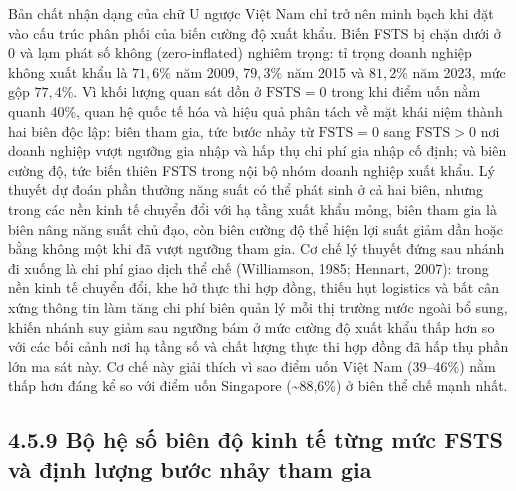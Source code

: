 \documentclass[
  a4paper,
  13pt]{extreport}
\begin{document}
Bản chất nhận dạng của chữ U ngược Việt Nam chỉ trở nên minh bạch khi
đặt vào cấu trúc phân phối của biến cường độ xuất khẩu. Biến FSTS bị
chặn dưới ở 0 và lạm phát số không (zero-inflated) nghiêm trọng: tỉ
trọng doanh nghiệp không xuất khẩu là \(71{,}6\%\) năm 2009,
\(79{,}3\%\) năm 2015 và \(81{,}2\%\) năm 2023, mức gộp \(77{,}4\%\). Vì
khối lượng quan sát dồn ở \(\mathrm{FSTS} = 0\) trong khi điểm uốn nằm
quanh 40\%, quan hệ quốc tế hóa và hiệu quả phân tách về mặt khái niệm
thành hai biên độc lập: biên tham gia, tức bước nhảy từ
\(\mathrm{FSTS} = 0\) sang \(\mathrm{FSTS} > 0\) nơi doanh nghiệp vượt
ngưỡng gia nhập và hấp thụ chi phí gia nhập cố định; và biên cường độ,
tức biến thiên FSTS trong nội bộ nhóm doanh nghiệp xuất khẩu. Lý thuyết
dự đoán phần thưởng năng suất có thể phát sinh ở cả hai biên, nhưng
trong các nền kinh tế chuyển đổi với hạ tầng xuất khẩu mỏng, biên tham
gia là biên nâng năng suất chủ đạo, còn biên cường độ thể hiện lợi suất
giảm dần hoặc bằng không một khi đã vượt ngưỡng tham gia. Cơ chế lý
thuyết đứng sau nhánh đi xuống là chi phí giao dịch thể chế (Williamson,
1985; Hennart, 2007): trong nền kinh tế chuyển đổi, khe hở thực thi hợp
đồng, thiếu hụt logistics và bất cân xứng thông tin làm tăng chi phí
biên quản lý mỗi thị trường nước ngoài bổ sung, khiến nhánh suy giảm sau
ngưỡng bám ở mức cường độ xuất khẩu thấp hơn so với các bối cảnh nơi hạ
tầng số và chất lượng thực thi hợp đồng đã hấp thụ phần lớn ma sát này.
Cơ chế này giải thích vì sao điểm uốn Việt Nam (39--46\%) nằm thấp hơn
đáng kể so với điểm uốn Singapore (\textasciitilde88,6\%) ở biên thể chế
mạnh nhất.

\hypertarget{bux1ed9-hux1ec7-sux1ed1-biuxean-ux111ux1ed9-kinh-tux1ebf-tux1eebng-mux1ee9c-fsts-vuxe0-ux111ux1ecbnh-lux1b0ux1ee3ng-bux1b0ux1edbc-nhux1ea3y-tham-gia}{%
\subsection{4.5.9 Bộ hệ số biên độ kinh tế từng mức FSTS và định lượng
bước nhảy tham
gia}\label{bux1ed9-hux1ec7-sux1ed1-biuxean-ux111ux1ed9-kinh-tux1ebf-tux1eebng-mux1ee9c-fsts-vuxe0-ux111ux1ecbnh-lux1b0ux1ee3ng-bux1b0ux1edbc-nhux1ea3y-tham-gia}}
\end{document}
